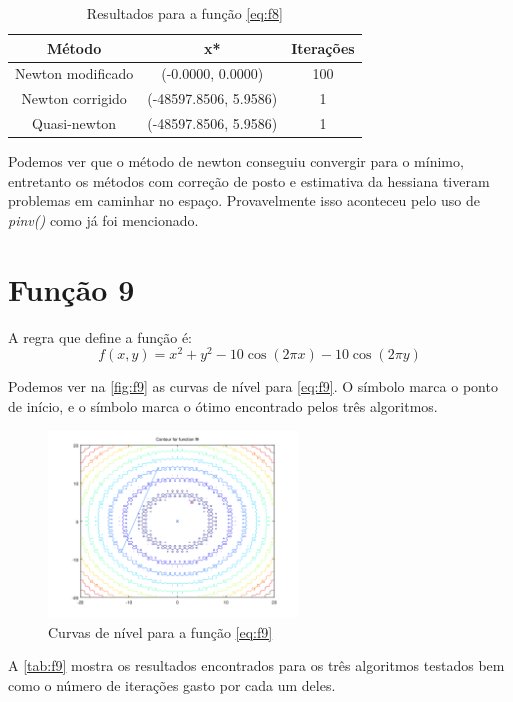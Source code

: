 \documentclass[12pt]{article}
\begin{document}
\begin{table}[H]
\centering
\begin{tabular}{*3c}
\toprule
Método			&	x*		&	Iterações\\
\midrule
Newton modificado	&	(-0.0000, 0.0000)	&	100\\
Newton corrigido	&	(-48597.8506, 5.9586)	&	1\\
Quasi-newton		&	(-48597.8506, 5.9586)	&	1\\
\bottomrule
\end{tabular}
\caption{\small{Resultados para a função \autoref{eq:f8} }}
\label{tab:f8}
\end{table}

Podemos ver que o método de newton conseguiu convergir para o mínimo, entretanto os métodos com correção de posto e estimativa da hessiana
tiveram problemas em caminhar no espaço. Provavelmente isso aconteceu pelo uso de \textit{pinv()} como já foi mencionado.

\section{Função 9}
A regra que define a função é:
\begin{equation}
\label{eq:f9}
f(x, y) = x^2 + y^2 - 10\cos(2\pi x) -10\cos(2\pi y)
\end{equation}

Podemos ver na \autoref{fig:f9} as curvas de nível para \autoref{eq:f9}. O símbolo \textit{\textopenbullet} marca o ponto de início,
e o símbolo \textit{\texttimes} marca o ótimo encontrado pelos três algoritmos.

\begin{figure}[H]
  \centering
  \includegraphics[width=250px]{../matlab/images/f9_contour}
  \caption{Curvas de nível para a função \autoref{eq:f9}}
  \label{fig:f9}
\end{figure}

A \autoref{tab:f9} mostra os resultados encontrados para os três algoritmos testados bem como o número de iterações gasto por cada um deles.
\end{document}
